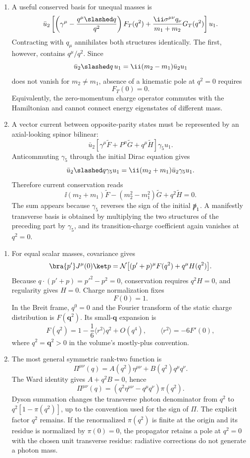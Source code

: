 \begin{enumerate}
\begin{enumerate}
\item
A useful conserved basis for unequal masses is
\[
 \bar u_2\left[
 \left(\gamma^\mu-\frac{q^\mu\slashed q}{q^2}\right)F_T(q^2)
 +\frac{\ii\sigma^{\mu\nu}q_\nu}{m_1+m_2}G_T(q^2)
 \right]u_1 .
\]
Contracting with \(q_\mu\) annihilates both structures identically.  The
first, however, contains \(q^\mu/q^2\).  Since
\[
 \bar u_2\slashed q\,u_1
 =\ii(m_2-m_1)\bar u_2u_1
\]
does not vanish for \(m_2\ne m_1\), absence of a kinematic pole at
\(q^2=0\) requires
\[
 \boxed{F_T(0)=0.}
\]
Equivalently, the zero-momentum charge operator commutes with the
Hamiltonian and cannot connect energy eigenstates of different mass.
\item
A vector current between opposite-parity states must be represented by an
axial-looking spinor bilinear:
\[
 \bar u_2\left[
 \gamma^\mu\widetilde F+P^\mu\widetilde G
 +q^\mu\widetilde H\right]\gamma_5u_1 .
\]
Anticommuting \(\gamma_5\) through the initial Dirac equation gives
\[
 \bar u_2\slashed q\gamma_5u_1
 =\ii(m_2+m_1)\bar u_2\gamma_5u_1.
\]
Therefore current conservation reads
\[
 \ii(m_2+m_1)\widetilde F
 -(m_2^2-m_1^2)\widetilde G
 +q^2\widetilde H=0.
\]
The sum appears because \(\gamma_5\) reverses the sign of the initial
\(\slashed p_1\).  A manifestly transverse basis is obtained by multiplying
  the two structures of the preceding part by \(\gamma_5\), and its
transition-charge coefficient again vanishes at \(q^2=0\).
\end{enumerate}

\begin{enumerate}
\item
For equal scalar masses, covariance gives
\[
 \bra{p'}J^\mu(0)\ket p
 =\mathcal N\bigl[(p'+p)^\mu F(q^2)+q^\mu H(q^2)\bigr].
\]
Because \(q\cdot(p'+p)=p'^2-p^2=0\), conservation requires
\(q^2H=0\), and regularity gives \(H=0\).  Charge normalization fixes
\[
 F(0)=1.
\]
In the Breit frame, \(q^0=0\) and the Fourier transform of the static
charge distribution is \(F(\mathbf q^2)\).  Its small-\(\mathbf q\)
expansion is
\[
 \boxed{\;
 F(q^2)=1-\frac16\langle r^2\rangle q^2+O(q^4),
 \qquad
 \langle r^2\rangle=-6F'(0),\;}
\]
where \(q^2=\mathbf q^2>0\) in the volume's mostly-plus convention.
\item
The most general symmetric rank-two function is
\[
 \Pi^{\mu\nu}(q)=A(q^2)\eta^{\mu\nu}
 +B(q^2)q^\mu q^\nu.
\]
The Ward identity gives \(A+q^2B=0\), hence
\[
 \boxed{\Pi^{\mu\nu}(q)
 =(q^2\eta^{\mu\nu}-q^\mu q^\nu)\pi(q^2).}
\]
Dyson summation changes the transverse photon denominator from \(q^2\) to
\(q^2[1-\pi(q^2)]\), up to the convention used for the sign of
\(\Pi\).  The explicit factor \(q^2\) remains.  If the renormalized
\(\pi(q^2)\) is finite at the origin and its residue is normalized by
\(\pi(0)=0\), the propagator retains a pole at \(q^2=0\) with the chosen
unit transverse residue: radiative corrections do not generate a photon
mass.
\end{enumerate}


\end{enumerate}

